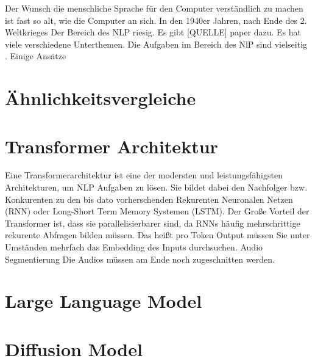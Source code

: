 Der Wunsch die menschliche Sprache für den Computer verständlich zu machen ist fast so alt, wie die Computer an sich. 
In den 1940er Jahren, nach Ende des 2. Weltkrieges 
Der Bereich des NLP riesig. 
Es gibt [QUELLE] paper dazu. 
Es hat viele verschiedene Unterthemen. 
Die Aufgaben im Bereich des NlP sind vielseitig . Einige Ansätze 

\section{Ähnlichkeitsvergleiche}
\section{Transformer Architektur}


Eine Transformerarchitektur ist eine der modersten und leistungsfähigsten Architekturen, um NLP Aufgaben zu lösen. 
Sie bildet dabei den Nachfolger bzw. Konkurenten zu den bis dato vorherschenden Rekurenten Neuronalen Netzen (RNN) oder Long-Short Term Memory Systemen (LSTM). 
Der Große Vorteil der Transformer ist, dass sie parallelisierbarer sind, da RNNs häufig mehrschrittige rekurente Abfragen bilden müssen.
Das heißt pro Token Output müssen Sie unter Umständen mehrfach das Embedding des Inputs durchsuchen. Audio Segmentierung Die Audios müssen am Ende noch zugeschnitten werden. 



\section{Large Language Model}

\section{Diffusion Model}